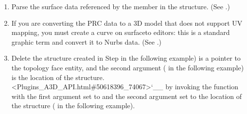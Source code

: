 \documentclass[letterpaper,12pt,english,openany,oneside]{sphinxmanual}
\begin{document}
\begin{sphinxVerbatim}[commandchars=\\\{\}]
 
    
\end{sphinxVerbatim}
\begin{enumerate}
%
\setcounter{enumi}{2}
\item {} 
Parse the surface data referenced by the  member in the  structure. (See .)

\item {} 
If you are converting the PRC data to a 3D model that does not support UV mapping, you must create a curve on surfaceto editors: this is a standard graphic term and convert it to Nurbs data. (See .)

\item {} 
Delete the  structure created in Step  in the following example) is a pointer to the topology face entity, and the second argument ( in the following example) is the location of the  structure. <Plugins\_A3D\_API.html\#50618396\_74067>`\_\_ by invoking the  function with the first argument set to  and the second argument set to the location of the structure ( in the following example).

\end{enumerate}

\begin{sphinxVerbatim}[commandchars=\\\{\}]
 
\end{sphinxVerbatim}
\end{document}
